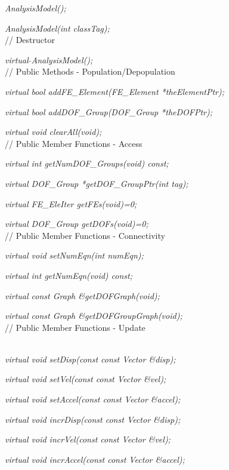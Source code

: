 {\em AnalysisModel();}  

{\em AnalysisModel(int classTag);}  \\ 

// Destructor  

{\em virtual $\tilde{ }$AnalysisModel();}  \\

// Public Methods - Population/Depopulation  

{\em virtual bool addFE\_Element(FE\_Element *theElementPtr);}  

{\em virtual bool addDOF\_Group(DOF\_Group *theDOFPtr);}  

{\em virtual void clearAll(void);} \\ 

// Public Member Functions - Access  

{\em virtual int getNumDOF\_Groups(void) const;}

{\em virtual DOF\_Group *getDOF\_GroupPtr(int tag);}

{\em virtual FE\_EleIter getFEs(void)=0;} 

{\em virtual DOF\_Group getDOFs(void)=0;} \\ 

// Public Member Functions - Connectivity  

{\em virtual void setNumEqn(int numEqn);} 

{\em virtual int getNumEqn(void) const;} 

{\em virtual const Graph \&getDOFGraph(void);} 

{\em virtual const Graph \&getDOFGroupGraph(void);} \\ 

// Public Member Functions - Update  

\\ 
{\em virtual void setDisp(const const Vector \&disp);} 

{\em virtual void setVel(const const Vector \&vel);} 

{\em virtual void setAccel(const const Vector \&accel);} 

{\em virtual void incrDisp(const const Vector \&disp);} 

{\em virtual void incrVel(const const Vector \&vel);} 

{\em virtual void incrAccel(const const Vector \&accel);} \\

